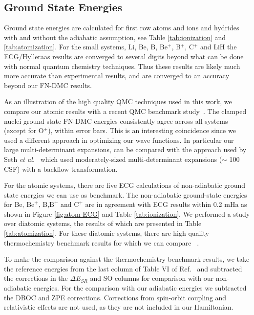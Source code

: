 \documentclass[pra,superscriptaddress,groupedaddress,twocolumn]{revtex4}
\begin{document}
\subsection{Ground State Energies}

Ground state energies are calculated for first row atoms and ions and hydrides with and without the adiabatic assumption, see Table \ref{tab:ionization} and \ref{tab:atomization}. For the small systems, Li, Be, B, Be$^+$, B$^+$, C$^+$ and LiH the ECG/Hylleraas results are converged to several digits beyond what can be done with normal quantum chemistry techniques. Thus these results are likely much more accurate than experimental results, and are converged to an accuracy beyond our FN-DMC results.

As an illustration of the high quality QMC techniques used in this work, we compare our atomic results with a recent QMC benchmark study~\cite{Seth_Bench}. The clamped nuclei ground state FN-DMC energies consistently agree across all systems (except for O$^{+}$), within error bars. This is an interesting coincidence since we used a different approach in optimizing our wave functions. In particular our large multi-determinant expansions, can be compared with the approach used by Seth {\it et al.}~\cite{Seth_Bench} which used moderately-sized multi-determinant expansions ($\sim$ 100 CSF) with a backflow transformation.   
 
For the atomic systems, there are five ECG calculations of non-adiabatic ground state energies we can use as benchmark. The non-adiabatic ground-state energies for Be, $\text{Be}^+$, B,$\text{B}^+$ and $\text{C}^+$ are in agreement with ECG results within 0.2 mHa as shown in Figure \ref{fig:atom-ECG} and Table \ref{tab:ionization}. We performed a study over diatomic systems, the results of which are presented in Table \ref{tab:atomization}. For these diatomic systems, there are high quality thermochemistry benchmark results for which we can compare ~\cite{Feller_Corrections}. 

To make the comparison against the thermochemistry benchmark results, we take the reference energies from the last column of Table VI of Ref.~\cite{Feller_Corrections} and subtracted the corrections in the $\Delta E_{SR}$ and SO columns for comparison with our non-adiabatic energies.  For the comparison with our adiabatic energies we subtracted the DBOC and ZPE corrections.  Corrections from spin-orbit coupling and relativistic effects are not used, as they are not included in our Hamiltonian.
\end{document}
